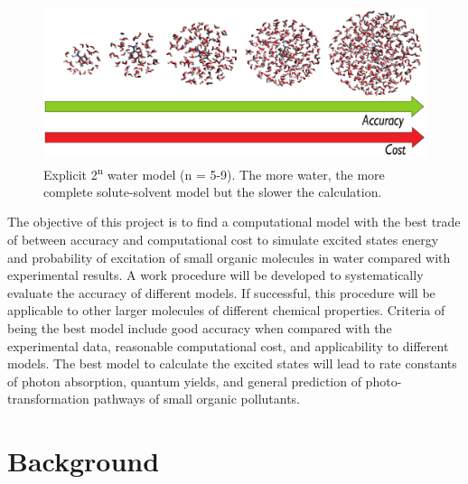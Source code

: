 \documentclass[
journal=jpcbfk, %
manuscript=article]{achemso}
\begin{document}
	\begin{figure}[htb]
		\vspace{-10pt}
		\centering		
		\includegraphics[width=1\textwidth]{images/tradeOff.pdf}
		\caption{ Explicit 2\textsuperscript{n} water model (n = 5-9). The more water, the more complete solute-solvent model but the slower the calculation.}
		\label{fig:tradeOffNumberOfWaterMolecules}
	\end{figure}
	
	The objective of this project is to find a computational model with the best trade of between accuracy and computational cost to simulate excited states energy and probability of excitation of small organic molecules in water compared with experimental results. A work procedure will be developed to systematically evaluate the accuracy of different models. If successful, this procedure will be applicable to other larger molecules of different chemical properties. Criteria of being the best model include good accuracy when compared with the experimental data, reasonable computational cost, and applicability to different models. The best model to calculate the excited states will lead to rate constants of photon absorption, quantum yields, and general prediction of photo-transformation pathways of small organic pollutants.

	\pagebreak
	\section{Background}
\end{document}
